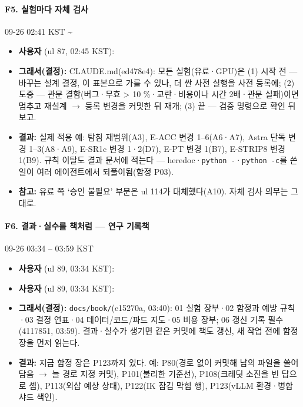 \paragraph{F5. 실험마다 자체 검사}
{\small 09-26 02:41 KST \textasciitilde{}}
\begin{itemize}
  \item \textbf{사용자} (ul 87, 02:45 KST): 
  \item \textbf{그래서(결정):} CLAUDE.md(ed478e4): 모든 실험(유료·GPU)은 (1) 시작 전 --- 바꾸는 설계 결정, 이 표본으로 가를 수 있나, 더 싼 사전 실행을 사전 등록에; (2) 도중 --- 관문 결함(버그·무효 > 10 \%·교란·비용이나 시간 2배·관문 실패)이면 멈추고 재설계 $\rightarrow$ 등록 변경을 커밋한 뒤 재개; (3) 끝 --- 검증 명령으로 확인 뒤 보고.
  \item \textbf{결과:} 실제 적용 예: 탐침 재범위(A3), E-ACC 변경 1--6(A6·A7), Astra 단독 변경 1--3(A8·A9), E-SR1c 변경 1·2(D7), E-PT 변경 1(B7), E-STRIP8 변경 1(B9). 규칙 이탈도 결과 문서에 적는다 --- heredoc·\texttt{python -\allowbreak{}}·\texttt{python -\allowbreak{}c}를 쓴 일이 여러 에이전트에서 되풀이됨(함정 P03).
  \item \textbf{참고:} 유료 쪽 `승인 불필요' 부분은 ul 114가 대체했다(A10). 자체 검사 의무는 그대로.
\end{itemize}

\paragraph{F6. 결과·실수를 책처럼 --- 연구 기록책}
{\small 09-26 03:34 -- 03:59 KST}
\begin{itemize}
  \item \textbf{사용자} (ul 89, 03:34 KST): 
  \item \textbf{사용자} (ul 89, 03:34 KST): 
  \item \textbf{그래서(결정):} \texttt{docs/\allowbreak{}book/\allowbreak{}}(e15270a, 03:40): 01 실험 장부·02 함정과 예방 규칙·03 결정 연표·04 데이터/코드/파드 지도·05 비용 장부; 06 갱신 기록 필수(4117851, 03:59). 결과·실수가 생기면 같은 커밋에 책도 갱신, 새 작업 전에 함정 장을 먼저 읽는다.
  \item \textbf{결과:} 지금 함정 장은 P123까지 있다. 예: P80(경로 없이 커밋해 남의 파일을 쓸어 담음 $\rightarrow$ 늘 경로 지정 커밋), P101(불리한 기준선), P108(크레딧 소진을 빈 답으로 셈), P113(외삽 예상 상태), P122(IK 잠김 막힘 행), P123(vLLM 환경·병합 샤드 색인).
\end{itemize}

